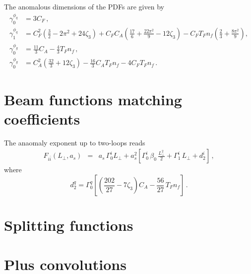 \documentclass[a4paper,11pt]{article}
\numberwithin{equation}{section}
\begin{document}
The anomalous dimensions of the PDFs are given by
\begin{align}
  \gamma^{\phi_q}_0 &= 3C_F \, ,
  \nonumber\\
  \gamma^{\phi_q}_1 &= C_F^2 \left( \frac{3}{2} - 2\pi^2 + 24\zeta_3 \right) + C_F C_A
  \left( \frac{17}{6} + \frac{22\pi^2}{9} - 12\zeta_3 \right) - C_F T_F n_f \left(
    \frac{2}{3} + \frac{8\pi^2}{9} \right) ,
  \nonumber\\
  \gamma^{\phi_g}_0 &= \frac{11}{3} C_A - \frac{4}{3} T_F n_f \, ,
  \nonumber\\
  \gamma^{\phi_g}_0 &= C_A^2 \left( \frac{32}{3} + 12\zeta_3 \right) - \frac{16}{3} C_A
  T_F n_f - 4 C_F T_F n_f \,.
\end{align}

\section{Beam functions matching coefficients}

The anaomaly exponent up to two-loops reads
%
\begin{eqnarray}
   F_{i\bar i}(L_\perp,a_s) &=& 
   a_s\,\Gamma_0^i L_\perp +
   a_s^2 \left[\Gamma_0^i\, \beta_0\,\frac{L_\perp^2}{2} + 
               \Gamma_1^i\,L_\perp + d_2^i \right] \,,
\end{eqnarray}
%
where
%
\begin{equation}
  d_2^q = {\Gamma_0^q} \left[
  \left( \frac{202}{27} - 7\zeta_3 \right) C_A - \frac{56}{27}\,T_F n_f
  \right]\,.
\end{equation}

\section{Splitting functions}

\section{Plus convolutions}


\end{document}
